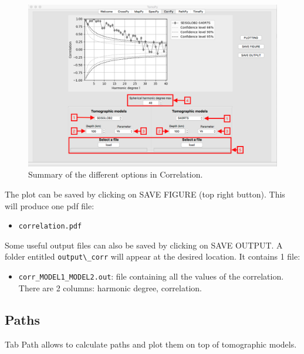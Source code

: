 \documentclass[12pt]{article}
\providecommand{\tightlist}{%
      \setlength{\itemsep}{0pt}\setlength{\parskip}{0pt}}
\begin{document}
\begin{figure}
\begin{center}
\includegraphics[scale=0.35]{SeisTomoPy_notebook/figures/corrpy.png}
\caption{Summary of the different options in Correlation.}
\label{corrpy}
\end{center}
\end{figure}

The plot can be saved by clicking on SAVE FIGURE (top right button). This will produce one pdf
file:
\begin{itemize}
\tightlist
\item
  \verb?correlation.pdf?
\end{itemize}

Some useful output files can also be saved by clicking on SAVE OUTPUT. A
folder entitled \verb?output\_corr? will appear at the desired location. It
contains 1 file:

\begin{itemize}
\tightlist
\item
  \verb?corr_MODEL1_MODEL2.out?: file containing all the values of the
  correlation. There are 2 columns: harmonic degree, correlation.
\end{itemize}

\subsection{Paths}\label{pathpy}

Tab Path allows to calculate paths and plot them on top of tomographic models. \\
\end{document}
